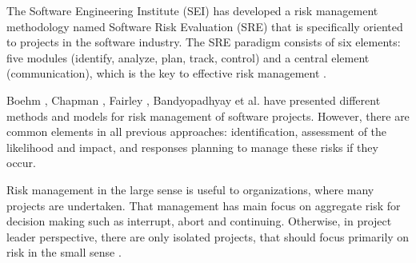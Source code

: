 The Software Engineering Institute (SEI) has developed a risk management methodology named Software Risk Evaluation (SRE) that is specifically oriented to projects in the software industry. The SRE paradigm consists of six elements: five modules (identify, analyze, plan, track, control) and a central element (communication), which is the key to effective risk management \cite{HIGUERAHAIMES1996} \cite{williams1999software}.

Boehm \cite{BOEHM1991}, Chapman \cite{chapman1996project}, Fairley \cite{fairley1994risk}, Bandyopadhyay et al. \cite{bandyopadhyay1999framework} have presented different methods and models for risk management of software projects. However, there are common elements in all previous approaches: identification, assessment of the likelihood and impact, and responses planning to manage these risks if they occur.

Risk management in the large sense is useful to organizations, where many projects are undertaken. That management has main focus on aggregate risk for decision making such as interrupt, abort and continuing. Otherwise, in project leader perspective, there are only isolated projects, that should focus primarily on risk in the small sense \cite{kendrick2003identifying}.

